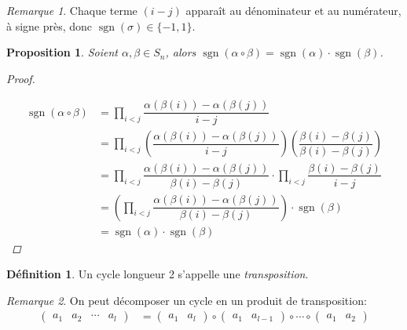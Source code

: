 \documentclass{report}
\newcommand*{\signe}{\operatorname{sgn}}
\newtheorem*{prop}{Proposition}
\theoremstyle{definition}
\newtheorem*{defin}{D\'efinition}
\theoremstyle{remark}
\newtheorem*{rema}{Remarque}
\begin{document}
	\begin{rema}
		Chaque terme $(i-j)$ appara\^it au d\'enominateur et au num\'erateur, \`a signe pr\`es, donc $\signe(\sigma) \in \{-1,1\}$.
	\end{rema}
	\begin{prop}
		Soient $\alpha, \beta \in S_n$, alors $\signe(\alpha \circ \beta) = \signe(\alpha) \cdot \signe(\beta)$.
		\begin{proof}~

			\begin{align*}
				\signe(\alpha \circ \beta)&= \prod_{i < j}\dfrac{\alpha(\beta(i)) - \alpha(\beta(j))}{i-j}\\
				&= \prod_{i < j}\left( \dfrac{\alpha(\beta(i)) - \alpha(\beta(j))}{i-j} \right) \left( \dfrac{\beta(i) - \beta(j)}{\beta(i) - \beta(j)} \right)\\
				&= \prod_{i < j}\dfrac{\alpha(\beta(i)) - \alpha(\beta(j))}{\beta(i) - \beta(j)} \cdot \prod_{i < j}\dfrac{\beta(i) - \beta(j)}{i-j}\\
				&= \left( \prod_{i < j}\dfrac{\alpha(\beta(i)) - \alpha(\beta(j))}{\beta(i) - \beta(j)} \right) \cdot \signe(\beta)\\
				&= \signe(\alpha) \cdot \signe(\beta)
			\end{align*}
		\end{proof}
	\end{prop}
	\begin{defin}
		Un cycle longueur 2 s'appelle une \emph{transposition}.
	\end{defin}
	\begin{rema}
		On peut d\'ecomposer un cycle en un produit de transposition:
		\begin{align*}
			\begin{pmatrix}
				a_1&a_2&\dotsb&a_l
			\end{pmatrix}&= \begin{pmatrix}
				a_1&a_l
			\end{pmatrix} \circ \begin{pmatrix}
				a_1&a_{l-1}
			\end{pmatrix} \circ \dotsb \circ \begin{pmatrix}
				a_1&a_2
			\end{pmatrix}
		\end{align*}
	\end{rema}
\end{document}
